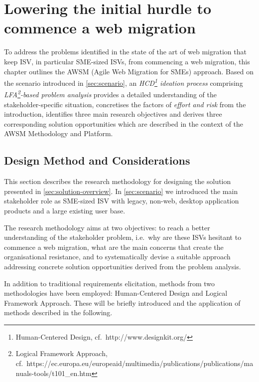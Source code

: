 \hypertarget{sec:solution}{%
\chapter{Lowering the initial hurdle to commence a web migration}\label{sec:solution}}

To address the problems identified in the state of the art of web migration that keep ISV, in particular SME-sized ISVs, from commencing a web migration, this chapter outlines the AWSM (Agile Web Migration for SMEs) \autocite{Heil2016AWSM} approach.
Based on the scenario introduced in \cref{sec:scenario}, an \emph{HCD\footnote{Human-Centered Design, cf.~http://www.designkit.org/} ideation process} comprising \emph{LFA\footnote{Logical Framework Approach, cf.~https://ec.europa.eu/europeaid/multimedia/publications/publications/manuals-tools/t101\_en.htm}-based problem analysis} provides a detailed understanding of the stakeholder-specific situation, concretises the factors of \emph{effort and risk} from the introduction, identifies three main research objectives and derives three corresponding solution opportunities which are described in the context of the AWSM Methodology and Platform.

\hypertarget{design-method-and-considerations}{%
\section{Design Method and Considerations}\label{design-method-and-considerations}}

This section describes the research methodology for designing the solution presented in \cref{sec:solution-overview}.
In \cref{sec:scenario} we introduced the main stakeholder role as SME-sized ISV with legacy, non-web, desktop application products and a large existing user base.

The research methodology aims at two objectives: to reach a better understanding of the stakeholder problem, i.e.~why are these ISVs hesitant to commence a web migration, what are the main concerns that create the organisational resistance, and to systematically devise a suitable approach addressing concrete solution opportunities derived from the problem analysis.

In addition to traditional requirements elicitation, methods from two methodologies have been employed: Human-Centered Design and Logical Framework Approach.
These will be briefly introduced and the application of methods described in the following.


